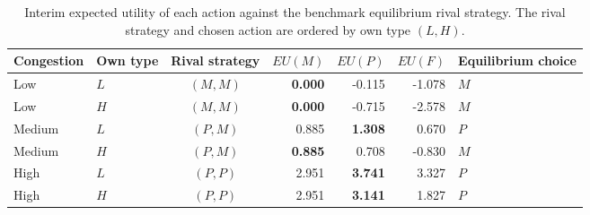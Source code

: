 \begin{table}[t]
\caption{Interim expected utility of each action against the benchmark equilibrium rival strategy. The rival strategy and chosen action are ordered by own type $(L,H)$.}
\label{tab:eu}
\centering
\small
\begin{tabular}{@{}llcrrrl@{}}
\toprule
Congestion & Own type & Rival strategy & $EU(M)$ & $EU(P)$ & $EU(F)$ & Equilibrium choice \\
\midrule
Low & $L$ & $(M,M)$ & \textbf{0.000} & -0.115 & -1.078 & $M$ \\
Low & $H$ & $(M,M)$ & \textbf{0.000} & -0.715 & -2.578 & $M$ \\
Medium & $L$ & $(P,M)$ & 0.885 & \textbf{1.308} & 0.670 & $P$ \\
Medium & $H$ & $(P,M)$ & \textbf{0.885} & 0.708 & -0.830 & $M$ \\
High & $L$ & $(P,P)$ & 2.951 & \textbf{3.741} & 3.327 & $P$ \\
High & $H$ & $(P,P)$ & 2.951 & \textbf{3.141} & 1.827 & $P$ \\
\bottomrule
\end{tabular}
\end{table}

